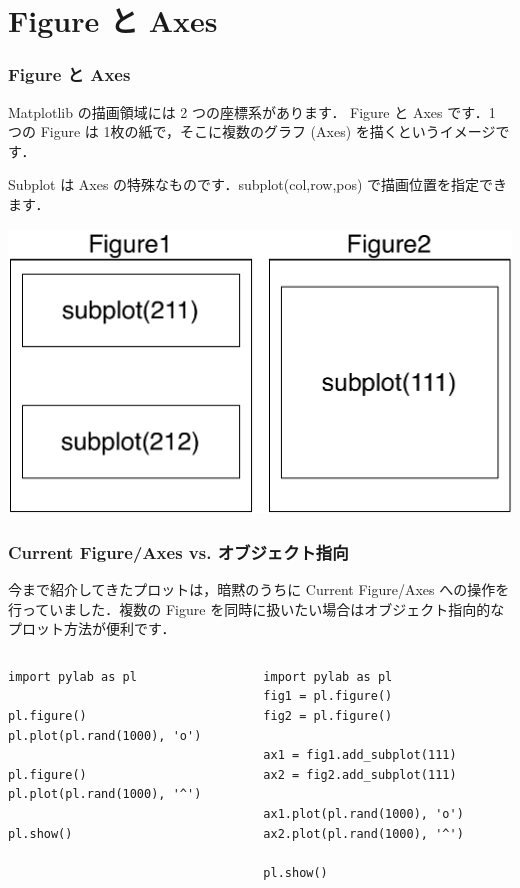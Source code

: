 \section{Figure と Axes}
\begin{frame}[t,fragile]
\frametitle{Figure と Axes}
Matplotlib の描画領域には 2 つの座標系があります．
Figure と Axes です．1 つの Figure は 1枚の紙で，そこに複数のグラフ (Axes) を描くというイメージです．

Subplot は Axes の特殊なものです．subplot(col,row,pos) で描画位置を指定できます．

\begin{center}
\includegraphics[scale=0.4]{fig_ax.pdf}
\end{center}
\end{frame}

\begin{frame}[t,fragile]
\frametitle{Current Figure/Axes vs. オブジェクト指向}
今まで紹介してきたプロットは，暗黙のうちに Current Figure/Axes への操作を行っていました．複数の Figure を同時に扱いたい場合はオブジェクト指向的なプロット方法が便利です．

\begin{columns}
\begin{column}{7cm}
\begin{lstlisting}
import pylab as pl

pl.figure() 
pl.plot(pl.rand(1000), 'o')

pl.figure()
pl.plot(pl.rand(1000), '^')

pl.show()
\end{lstlisting}
\end{column}

\begin{column}{7cm}
\begin{lstlisting}
import pylab as pl
fig1 = pl.figure() 
fig2 = pl.figure()

ax1 = fig1.add_subplot(111)  
ax2 = fig2.add_subplot(111)  

ax1.plot(pl.rand(1000), 'o')
ax2.plot(pl.rand(1000), '^')

pl.show()
\end{lstlisting}
\end{column}
\end{columns}
\end{frame}

